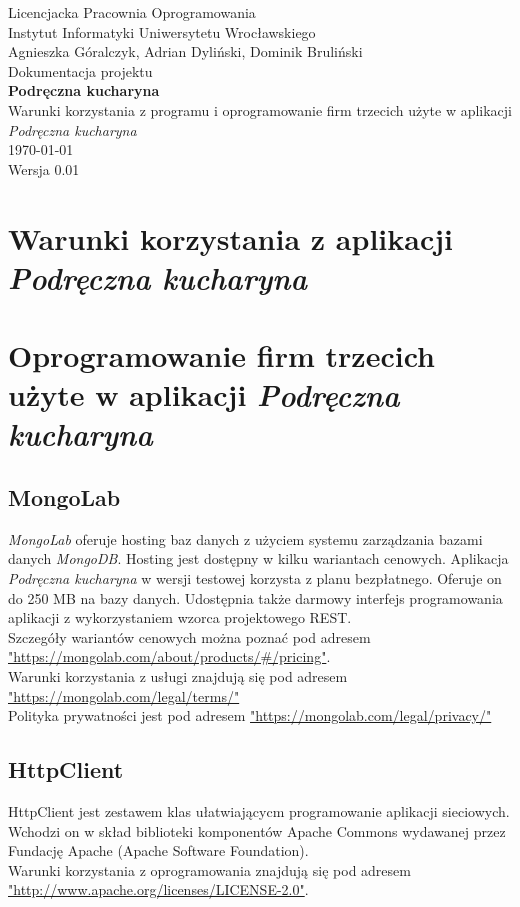 \documentclass[12pt,leqno, twoside]{mwart}
\begin{document}
\thispagestyle{empty}
\begin{center}
Licencjacka Pracownia Oprogramowania \\ Instytut
Informatyki Uniwersytetu Wrocławskiego \\
\vspace{4cm}
\Large Agnieszka Góralczyk, Adrian Dyliński, Dominik Bruliński \\
\vspace{0.5cm}
\huge Dokumentacja projektu\\ \textbf{Podręczna kucharyna}\\ \Large Warunki korzystania z programu i oprogramowanie firm trzecich użyte w aplikacji \emph{Podręczna kucharyna} \\
\vspace{1cm}
\normalsize \today \\
\vspace{2cm}
\normalsize Wersja 0.01
\end{center}

\newpage

\section{Warunki korzystania z aplikacji \emph{Podręczna kucharyna} }
\section{Oprogramowanie firm trzecich użyte w aplikacji \emph{Podręczna kucharyna} }
\subsection{MongoLab}
\emph{MongoLab} oferuje hosting baz danych z użyciem systemu zarządzania bazami danych \emph{MongoDB}.
Hosting jest dostępny w kilku wariantach cenowych.
Aplikacja \emph{Podręczna kucharyna} w wersji testowej korzysta z planu bezpłatnego.
Oferuje on do 250 MB na bazy danych.
Udostępnia także darmowy interfejs programowania aplikacji z wykorzystaniem wzorca projektowego REST. \\
Szczegóły wariantów cenowych można poznać pod adresem \url{"https://mongolab.com/about/products/#/pricing"}. \\
Warunki korzystania z usługi znajdują się pod adresem \url{"https://mongolab.com/legal/terms/"}\\
Polityka prywatności jest pod adresem \url{"https://mongolab.com/legal/privacy/"}
\subsection{HttpClient}
HttpClient jest zestawem klas ułatwiającycm programowanie aplikacji sieciowych.
Wchodzi on w skład biblioteki komponentów Apache Commons wydawanej przez Fundację Apache (Apache Software Foundation). \\
Warunki korzystania z oprogramowania znajdują się pod adresem \url{"http://www.apache.org/licenses/LICENSE-2.0"}.
\end{document}
